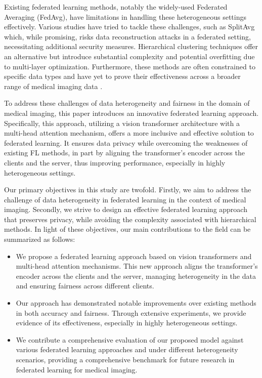 Existing federated learning methods, notably the widely-used Federated Averaging (FedAvg), have limitations in handling these heterogeneous settings effectively. Various studies have tried to tackle these challenges, such as SplitAvg \cite{zhang2022splitavg} which, while promising, risks data reconstruction attacks in a federated setting, necessitating additional security measures. Hierarchical clustering techniques \cite{yeganeh2022adaptive} \cite{gao2019hhhfl} offer an alternative but introduce substantial complexity and potential overfitting due to multi-layer optimization. Furthermore, these methods are often constrained to specific data types and have yet to prove their effectiveness across a broader range of medical imaging data \cite{gao2019hhhfl}.


To address these challenges of data heterogeneity and fairness in the domain of medical imaging, this paper introduces an innovative federated learning approach. Specifically, this approach, utilizing a vision transformer architecture with a multi-head attention mechanism, offers a more inclusive and effective solution to federated learning. It ensures data privacy while overcoming the weaknesses of existing FL methods, in part by aligning the transformer's encoder across the clients and the server, thus improving performance, especially in highly heterogeneous settings.


Our primary objectives in this study are twofold. Firstly, we aim to address the challenge of data heterogeneity in federated learning in the context of medical imaging. Secondly, we strive to design an effective federated learning approach that preserves privacy, while avoiding the complexity associated with hierarchical methods. In light of these objectives, our main contributions to the field can be summarized as follows:
\begin{itemize}

    \item 
We propose a federated learning approach based on vision transformers and multi-head attention mechanisms. This new approach aligns the transformer's encoder across the clients and the server, managing heterogeneity in the data and ensuring fairness across different clients.

    \item 
Our approach has demonstrated notable improvements over existing methods in both accuracy and fairness. Through extensive experiments, we provide evidence of its effectiveness, especially in highly heterogeneous settings.

    \item 
We contribute a comprehensive evaluation of our proposed model against various federated learning approaches and under different heterogeneity scenarios, providing a comprehensive benchmark for future research in federated learning for medical imaging.

\end{itemize}
